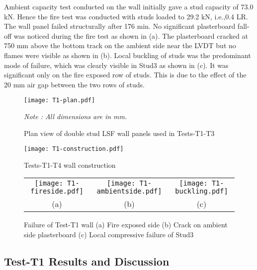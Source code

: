 Ambient capacity test conducted on the wall initially gave a stud capacity of 73.0 kN. Hence the fire test was conducted with studs loaded to 29.2 kN, i.e.,0.4 LR. The wall panel failed structurally after 176 min. No significant plasterboard fall-off was noticed during the fire test as shown in  (a). The plasterboard cracked at 750 mm above the bottom track on the ambient side near the LVDT but no flames were visible as shown in  (b). Local buckling of studs was the predominant mode of failure, which was clearly visible in Stud3 as shown in  (c). It was significant only on the fire exposed row of studs. This is due to the effect of the 20 mm air gap between the two rows of studs. 
\begin{figure}[htbp]
	\centering
	\texttt{[image: T1-plan.pdf]}
	\caption{Plan view of double stud LSF wall panels used in Tests-T1-T3}
	\label{fig:T1-plan}
	\fontsize{10}{1}\textit{Note : All dimensions are in mm.}
\end{figure}
\begin{figure}[htbp]
	\centering
	\texttt{[image: T1-construction.pdf]}
	\caption{Tests-T1-T4 wall construction}
	\label{fig:T1-construction}
\end{figure}
\begin{figure}[htbp]
	\centering
		\begin{tabular}{ccc}
			\texttt{[image: T1-fireside.pdf]} & 
			\texttt{[image: T1-ambientside.pdf]} &
			\texttt{[image: T1-buckling.pdf]} \\	 
			(a) & (b) & (c)  \\ 
		\end{tabular} 
		\caption{Failure of Test-T1 wall (a) Fire exposed side (b) Crack on ambient side plasterboard (c) Local compressive failure of Stud3}
		\label{fig:T1-failure}
\end{figure}

\subsection{Test-T1 Results and Discussion}

